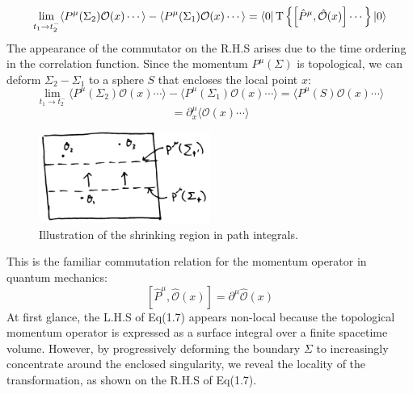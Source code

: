 \documentclass[12pt]{article}
\numberwithin{equation}{section}
\newcommand\<\langle
\renewcommand\>\rangle
\renewcommand\.{\cdot}
\begin{document}
\begin{equation}
    \lim_{t_1\rightarrow t_2^{-}}\langle P^{\mu}(\Sigma_2)\mathcal{O}(x)\cdots\rangle-\langle P^{\mu}(\Sigma_1)\mathcal{O}(x)\cdots\rangle = \bra{0}\text{T}\left\{\left[\hat{P}^\mu,\hat{\mathcal{O}}(x)\right]\cdots\right\}\ket{0}
\end{equation}
The appearance of the commutator on the R.H.S arises due to the time ordering in the correlation function. Since the momentum \( P^{\mu}(\Sigma) \) is topological, we can deform \( \Sigma_2 - \Sigma_1 \) to a sphere \( S \) that encloses the local point \( x \):
\[
    \lim_{t_1\rightarrow t_2^{-}}\langle P^{\mu}(\Sigma_2)\mathcal{O}(x)\cdots\rangle-\langle P^{\mu}(\Sigma_1)\mathcal{O}(x)\cdots\rangle = \langle P^{\mu}(S)\mathcal{O}(x)\cdots\rangle 
\]
\[
    =\partial_{x}^{\mu}\langle\mathcal{O}(x)\cdots\rangle
\]
\begin{figure}[h]
\centering
\includegraphics[width=0.5\textwidth]{slidingcharges.jpg} %
\caption{\label{fig:slidingcharges} Illustration of the shrinking region in path integrals.}
\end{figure}
This is the familiar commutation relation for the momentum operator in quantum mechanics:
\begin{equation}
    \left[\hat{P}^{\mu}, \hat{\mathcal{O}}(x)\right] = \partial^{\mu}\hat{\mathcal{O}}(x)
\end{equation}
At first glance, the L.H.S of Eq(1.7) appears non-local because the topological momentum operator is expressed as a surface integral over a finite spacetime volume. However, by progressively deforming the boundary \( \Sigma \) to increasingly concentrate around the enclosed singularity, we reveal the locality of the transformation, as shown on the R.H.S of Eq(1.7).
\end{document}
